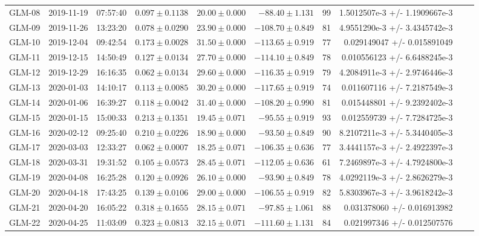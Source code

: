 \begin{table*}
\begin{tabular}{rrrrrrrrrr}
GLM-08 & 2019-11-19 & 07:57:40 & $0.097\pm 0.1138$ & $20.00 \pm 0.000$ & $-88.40 \pm   1.131$ & 99           & 1.5012507e-3 +/- 1.1909667e-3 \\
GLM-09 & 2019-11-26 & 13:23:20 & $0.078\pm 0.0290$ & $23.90 \pm 0.000$ & $-108.70 \pm  0.849$ & 81           & 4.9551290e-3 +/- 3.4345742e-3 \\
GLM-10 & 2019-12-04 & 09:42:54 & $0.173\pm 0.0028$ & $31.50 \pm 0.000$ & $-113.65 \pm  0.919$ & 77           & 0.029149047 +/- 0.015891049   \\
GLM-11 & 2019-12-15 & 14:50:49 & $0.127\pm 0.0134$ & $27.70 \pm 0.000$ & $-114.10 \pm  0.849$ & 78           & 0.010556123 +/- 6.6488245e-3  \\
GLM-12 & 2019-12-29 & 16:16:35 & $0.062\pm 0.0134$ & $29.60 \pm 0.000$ & $-116.35 \pm  0.919$ & 79           & 4.2084911e-3 +/- 2.9746446e-3 \\
GLM-13 & 2020-01-03 & 14:10:17 & $0.113\pm 0.0085$ & $30.20 \pm 0.000$ & $-117.65 \pm  0.919$ & 74           & 0.011607116 +/- 7.2187549e-3  \\
GLM-14 & 2020-01-06 & 16:39:27 & $0.118\pm 0.0042$ & $31.40 \pm 0.000$ & $-108.20 \pm  0.990$ & 81           & 0.015448801 +/- 9.2392402e-3  \\
GLM-15 & 2020-01-15 & 15:00:33 & $0.213\pm 0.1351$ & $19.45 \pm 0.071$ & $-95.55 \pm   0.919$ & 93           & 0.012559739 +/- 7.7284725e-3  \\
GLM-16 & 2020-02-12 & 09:25:40 & $0.210\pm 0.0226$ & $18.90 \pm 0.000$ & $-93.50 \pm   0.849$ & 90           & 8.2107211e-3 +/- 5.3440405e-3 \\
GLM-17 & 2020-03-03 & 12:33:27 & $0.062\pm 0.0007$ & $18.25 \pm 0.071$ & $-106.35 \pm  0.636$ & 77           & 3.4441157e-3 +/- 2.4922397e-3 \\
GLM-18 & 2020-03-31 & 19:31:52 & $0.105\pm 0.0573$ & $28.45 \pm 0.071$ & $-112.05 \pm  0.636$ & 61           & 7.2469897e-3 +/- 4.7924800e-3 \\
GLM-19 & 2020-04-08 & 16:25:28 & $0.120\pm 0.0926$ & $26.10 \pm 0.000$ & $-93.90 \pm   0.849$ & 78           & 4.0292119e-3 +/- 2.8626279e-3 \\
GLM-20 & 2020-04-18 & 17:43:25 & $0.139\pm 0.0106$ & $29.00 \pm 0.000$ & $-106.55 \pm  0.919$ & 82           & 5.8303967e-3 +/- 3.9618242e-3 \\
GLM-21 & 2020-04-20 & 16:05:22 & $0.318\pm 0.1655$ & $28.15 \pm 0.071$ & $-97.85 \pm   1.061$ & 88           & 0.031378060 +/- 0.016913982   \\
GLM-22 & 2020-04-25 & 11:03:09 & $0.323\pm 0.0813$ & $32.15 \pm 0.071$ & $-111.60 \pm  1.131$ & 84           & 0.021997346 +/- 0.012507576   \\

\end{tabular}
\end{table*}
